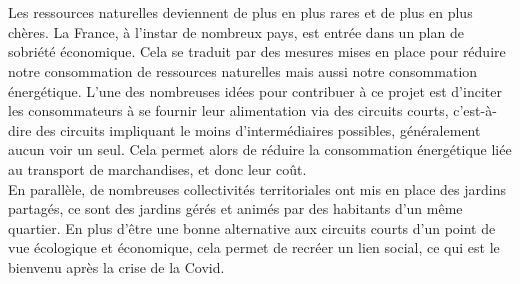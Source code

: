 \documentclass{report}
\begin{document}
    \section*{\color{orange}{\Large Contexte}} 
    Les ressources naturelles deviennent de plus en plus rares et de plus en plus chères. La France, à l’instar de nombreux pays, est entrée dans un plan de sobriété économique. Cela se traduit par des mesures mises en place pour réduire notre consommation de ressources naturelles mais aussi notre consommation énergétique. 
    L’une des nombreuses idées pour contribuer à ce projet est d’inciter les consommateurs à se fournir leur alimentation via des circuits courts, c'est-à-dire des circuits impliquant le moins d’intermédiaires possibles, généralement aucun voir un seul. Cela permet alors de réduire la consommation énergétique liée au transport de marchandises, et donc leur coût. \\
    En parallèle, de nombreuses collectivités territoriales ont mis en place des jardins partagés, ce sont des jardins gérés et animés par des habitants d’un même quartier. En plus d’être une bonne alternative aux circuits courts d’un point de vue écologique et économique, cela permet de recréer un lien social, ce qui est le bienvenu après la crise de la Covid. \\
    
\end{document}
